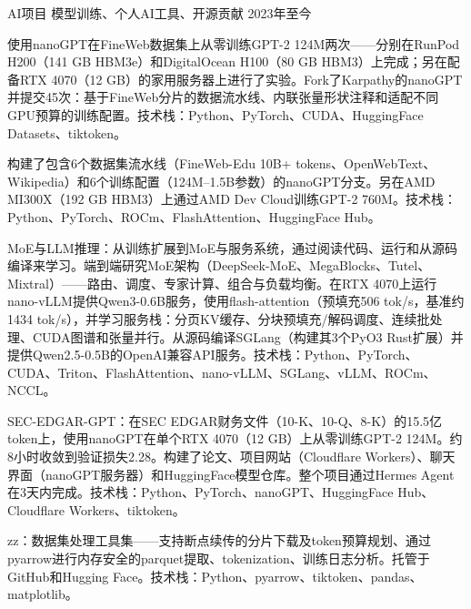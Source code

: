 
\begin{cventries}

  \cventry
    {AI项目} %
    {模型训练、个人AI工具、开源贡献} %
    {} %
    {2023年至今} %
    {
      \begin{cvitems} %
        \item {使用nanoGPT在FineWeb数据集上从零训练GPT-2 124M两次——分别在RunPod H200（141 GB HBM3e）和DigitalOcean H100（80 GB HBM3）上完成；另在配备RTX 4070（12 GB）的家用服务器上进行了实验。Fork了Karpathy的nanoGPT并提交45次：基于FineWeb分片的数据流水线、内联张量形状注释和适配不同GPU预算的训练配置。技术栈：Python、PyTorch、CUDA、HuggingFace Datasets、tiktoken。}
        \item {构建了包含6个数据集流水线（FineWeb-Edu 10B+ tokens、OpenWebText、Wikipedia）和6个训练配置（124M–1.5B参数）的nanoGPT分支。另在AMD MI300X（192 GB HBM3）上通过AMD Dev Cloud训练GPT-2 760M。技术栈：Python、PyTorch、ROCm、FlashAttention、HuggingFace Hub。}
        \item {MoE与LLM推理：从训练扩展到MoE与服务系统，通过阅读代码、运行和从源码编译来学习。端到端研究MoE架构（DeepSeek-MoE、MegaBlocks、Tutel、Mixtral）——路由、调度、专家计算、组合与负载均衡。在RTX 4070上运行nano-vLLM提供Qwen3-0.6B服务，使用flash-attention（预填充506 tok/s，基准约1434 tok/s），并学习服务栈：分页KV缓存、分块预填充/解码调度、连续批处理、CUDA图谱和张量并行。从源码编译SGLang（构建其3个PyO3 Rust扩展）并提供Qwen2.5-0.5B的OpenAI兼容API服务。技术栈：Python、PyTorch、CUDA、Triton、FlashAttention、nano-vLLM、SGLang、vLLM、ROCm、NCCL。}
        \item {SEC-EDGAR-GPT：在SEC EDGAR财务文件（10-K、10-Q、8-K）的15.5亿token上，使用nanoGPT在单个RTX 4070（12 GB）上从零训练GPT-2 124M。约8小时收敛到验证损失2.28。构建了论文、项目网站（Cloudflare Workers）、聊天界面（nanoGPT服务器）和HuggingFace模型仓库。整个项目通过Hermes Agent在3天内完成。技术栈：Python、PyTorch、nanoGPT、HuggingFace Hub、Cloudflare Workers、tiktoken。}
        \item {zz：数据集处理工具集——支持断点续传的分片下载及token预算规划、通过pyarrow进行内存安全的parquet提取、tokenization、训练日志分析。托管于GitHub和Hugging Face。技术栈：Python、pyarrow、tiktoken、pandas、matplotlib。}

\end{cvitems}}
\end{cventries}
